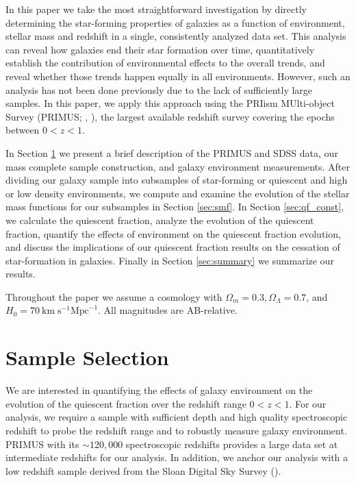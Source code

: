 
In this paper we take the most straightforward investigation
by directly determining the star-forming properties of galaxies
as a function of environment, stellar mass and redshift in a single,
consistently analyzed data set. This analysis can reveal how galaxies
end their star formation over time, quantitatively establish the
contribution of environmental effects to the overall trends, and
reveal whether those trends happen equally in all environments.
However, such an analysis has not been done previously due to the lack
of sufficiently large samples. In this paper, we apply this approach
using the PRIism MUlti-object Survey (PRIMUS; \citealt{Coil:2011aa},
\citealt{Cool:2013aa}), the largest available redshift survey covering
the epochs between $0<z<1$.

In Section \ref{sec:sample} we present a brief description of the
PRIMUS and SDSS data, our mass complete sample construction, and
galaxy environment measurements. After dividing our galaxy sample into
subsamples of star-forming or quiescent and high or low density
environments, we compute and examine the evolution of the stellar mass
functions for our subsamples in Section \ref{sec:smf}. In
Section \ref{sec:qf_const}, we calculate the quiescent fraction,
analyze the evolution of the quiescent fraction, quantify the effects
of environment on the quiescent fraction evolution, and discuss the
implications of our quiescent fraction results on the cessation of
star-formation in galaxies. Finally in Section \ref{sec:summary} we
summarize our results.

Throughout the paper we assume a cosmology with $\Omega_{m} = 0.3,
\Omega_{\Lambda} = 0.7$, and $H_0 = 70 \: \mathrm{km} \; \mathrm{s}^{-1}
\mathrm{Mpc}^{-1}$. All magnitudes are AB-relative. 

\section{Sample Selection} \label{sec:sample}
We are interested in quantifying the effects of galaxy environment on
the evolution of the quiescent fraction over the redshift range $0 < z < 1$. For our analysis, we require a sample with sufficient depth and high quality spectroscopic redshift to probe the redshift range and to robustly measure galaxy environment. PRIMUS with its $\sim 120,000$ spectroscopic redshifts provides a large data set at intermediate redshifts for our analysis. In addition, we anchor our analysis with a low redshift sample derived from the Sloan Digital Sky Survey (\citealt{York:2000aa}). 

